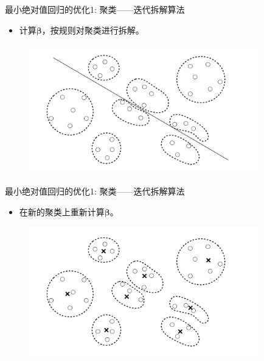 \begin{frame}{最小绝对值回归的优化1: 聚类——迭代拆解算法}
    \begin{itemize}
        \item 计算$\bm \beta$，按规则对聚类进行拆解。
    \end{itemize}
\begin{figure}[H]
\includegraphics[width=10cm]{pics/aid-demo-b.pdf}
\end{figure}
\end{frame}

\begin{frame}{最小绝对值回归的优化1: 聚类——迭代拆解算法}
    \begin{itemize}
        \item 在新的聚类上重新计算$\bm \beta$。
    \end{itemize}
\begin{figure}[H]
\includegraphics[width=10cm]{pics/aid-demo-c.pdf}
\end{figure}
\end{frame}

